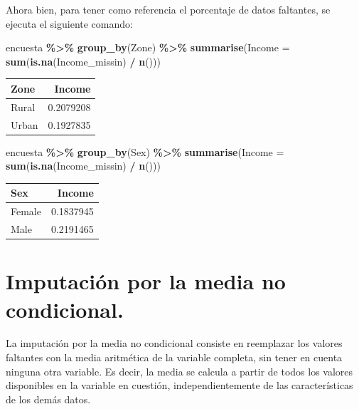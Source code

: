 \documentclass[
  12pt,
]{book}
\newenvironment{Shaded}{\begin{snugshade}}{\end{snugshade}}
\newcommand{\AttributeTok}[1]{\textcolor[rgb]{0.13,0.29,0.53}{#1}}
\newcommand{\FunctionTok}[1]{\textcolor[rgb]{0.13,0.29,0.53}{\textbf{#1}}}
\newcommand{\NormalTok}[1]{#1}
\newcommand{\SpecialCharTok}[1]{\textcolor[rgb]{0.81,0.36,0.00}{\textbf{#1}}}
\begin{document}
Ahora bien, para tener como referencia el porcentaje de datos faltantes, se ejecuta el siguiente comando:

\begin{Shaded}
\begin{Highlighting}[]
\NormalTok{encuesta }\SpecialCharTok{\%\textgreater{}\%} \FunctionTok{group\_by}\NormalTok{(Zone) }\SpecialCharTok{\%\textgreater{}\%} 
  \FunctionTok{summarise}\NormalTok{(}\AttributeTok{Income =} \FunctionTok{sum}\NormalTok{(}\FunctionTok{is.na}\NormalTok{(Income\_missin) }\SpecialCharTok{/} \FunctionTok{n}\NormalTok{()))}
\end{Highlighting}
\end{Shaded}

\begin{tabular}{l|r}
\hline
Zone & Income\\
\hline
Rural & 0.2079208\\
\hline
Urban & 0.1927835\\
\hline
\end{tabular}

\begin{Shaded}
\begin{Highlighting}[]
\NormalTok{encuesta }\SpecialCharTok{\%\textgreater{}\%} \FunctionTok{group\_by}\NormalTok{(Sex) }\SpecialCharTok{\%\textgreater{}\%} 
  \FunctionTok{summarise}\NormalTok{(}\AttributeTok{Income =} \FunctionTok{sum}\NormalTok{(}\FunctionTok{is.na}\NormalTok{(Income\_missin) }\SpecialCharTok{/} \FunctionTok{n}\NormalTok{()))}
\end{Highlighting}
\end{Shaded}

\begin{tabular}{l|r}
\hline
Sex & Income\\
\hline
Female & 0.1837945\\
\hline
Male & 0.2191465\\
\hline
\end{tabular}

\section{Imputación por la media no condicional.}\label{imputaciuxf3n-por-la-media-no-condicional.}

La imputación por la media no condicional consiste en reemplazar los valores faltantes con la media aritmética de la variable completa, sin tener en cuenta ninguna otra variable. Es decir, la media se calcula a partir de todos los valores disponibles en la variable en cuestión, independientemente de las características de los demás datos.
\end{document}

